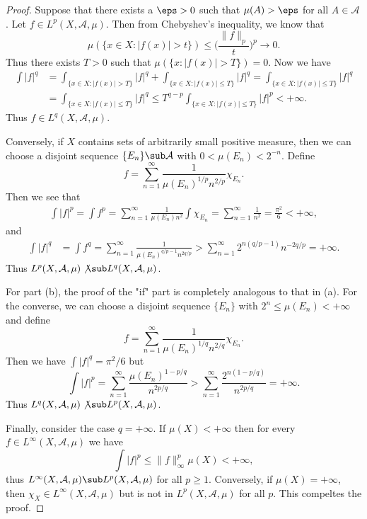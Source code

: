 \begin{proof}
Suppose that there exists a $\eps>0$ such that $\mu(A)>\eps$ for all $A\in\mathcal{A}$. Let $f\in L^p(X,\mathcal{A},\mu)$. Then from Chebyshev's inequality, we know that
\[\mu(\{x\in X:|f(x)|>t\})\leq\Big(\frac{\|f\|_p}{t}\Big)^p\to 0.\]
Thus there exists $T>0$ such that $\mu(\{x:|f(x)|>T\})=0$. Now we have
\begin{align*}
\int|f|^q&=\int_{\{x\in X:|f(x)|>T\}}|f|^q+\int_{\{x\in X:|f(x)|\leq T\}}|f|^q=\int_{\{x\in X:|f(x)|\leq T\}}|f|^q\\
&=\int_{\{x\in X:|f(x)|\leq T\}}|f|^q\leq T^{q-p}\int_{\{x\in X:|f(x)|\leq T\}}|f|^p<+\infty.
\end{align*}
Thus $f\in L^q(X,\mathcal{A},\mu)$.\par
Conversely, if $X$ contains sets of arbitrarily small positive measure, then we can choose a disjoint sequence $\{E_n\}\sub\mathcal{A}$ with $0<\mu(E_n)<2^{-n}$. Define
\[f=\sum_{n=1}^{\infty}\frac{1}{\mu(E_n)^{1/p}n^{2/p}}\chi_{E_n}.\]
Then we see that
\begin{align*}
\int|f|^p=\int f^p=\sum_{n=1}^{\infty}\frac{1}{\mu(E_n)n^{2}}\int\chi_{E_n}=\sum_{n=1}^{\infty}\frac{1}{n^2}=\frac{\pi^2}{6}<+\infty,
\end{align*}
and
\begin{align*}
\int|f|^q&=\int f^q=\sum_{n=1}^{\infty}\frac{1}{\mu(E_n)^{q/p-1}n^{2q/p}}>\sum_{n=1}^{\infty}2^{n(q/p-1)}n^{-2q/p}=+\infty.
\end{align*}
Thus $L^p(X,\mathcal{A},\mu)\not\sub L^q(X,\mathcal{A},\mu)$.\par
For part (b), the proof of the "if" part is completely analogous to that in (a). For the converse, we can choose a disjoint sequence $\{E_n\}$ with $2^n\leq\mu(E_n)<+\infty$ and define
\[f=\sum_{n=1}^{\infty}\frac{1}{\mu(E_n)^{1/q}n^{2/q}}\chi_{E_n}.\]
Then we have $\int|f|^q=\pi^2/6$ but
\[\int|f|^p=\sum_{n=1}^{\infty}\frac{\mu(E_n)^{1-p/q}}{n^{2p/q}}>\sum_{n=1}^{\infty}\frac{2^{n(1-p/q)}}{n^{2p/q}}=+\infty.\]
Thus $L^q(X,\mathcal{A},\mu)\not\sub L^p(X,\mathcal{A},\mu)$.\par
Finally, consider the case $q=+\infty$. If $\mu(X)<+\infty$ then for every $f\in L^\infty(X,\mathcal{A},\mu)$ we have
\[\int|f|^p\leq\|f\|_\infty^p\mu(X)<+\infty,\]
thus $L^\infty(X,\mathcal{A},\mu)\sub L^p(X,\mathcal{A},\mu)$ for all $p\geq 1$. Conversely, if $\mu(X)=+\infty$, then $\chi_X\in L^\infty(X,\mathcal{A},\mu)$ but is not in $L^p(X,\mathcal{A},\mu)$ for all $p$. This compeltes the proof.
\end{proof}
